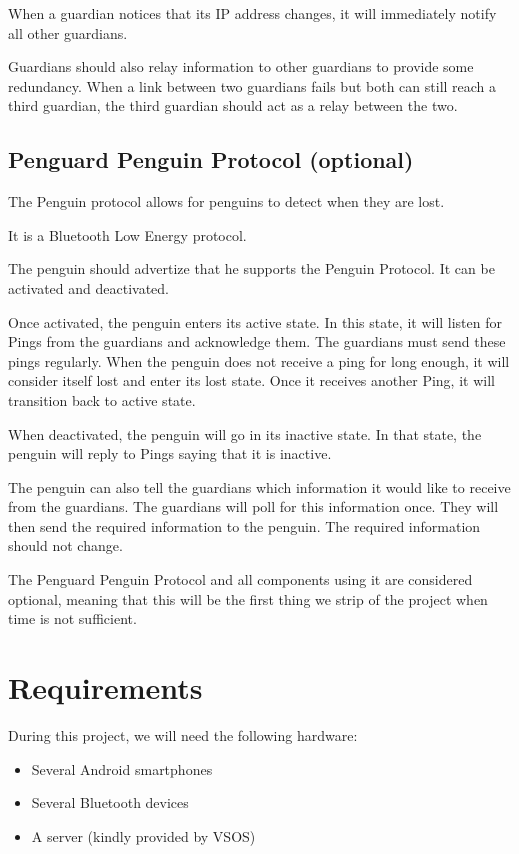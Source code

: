 \documentclass{report}
\begin{document}
When a guardian notices that its IP address changes, it will immediately notify all other guardians.

Guardians should also relay information to other guardians to provide some redundancy. When a link between two guardians fails but both can still reach a third guardian, the third guardian should act as a relay between the two.

\subsection{Penguard Penguin Protocol (optional)}

The Penguin protocol allows for penguins to detect when they are lost.

It is a Bluetooth Low Energy protocol.

The penguin should advertize that he supports the Penguin Protocol. It can be activated and deactivated.

Once activated, the penguin enters its active state. In this state, it will listen for Pings from the guardians and acknowledge them. The guardians must send these pings regularly. When the penguin does not receive a ping for long enough, it will consider itself lost and enter its lost state. Once it receives another Ping, it will transition back to active state.

When deactivated, the penguin will go in its inactive state. In that state, the penguin will reply to Pings saying that it is inactive.

The penguin can also tell the guardians which information it would like to receive from the guardians. The guardians will poll for this information once. They will then send the required information to the penguin. The required information should not change.

The Penguard Penguin Protocol and all components using it are considered optional, meaning that this will be the first thing we strip of the project when time is not sufficient.

\section{Requirements}

During this project, we will need the following hardware:

\begin{itemize}
    \item Several Android smartphones
    \item Several Bluetooth devices
    \item A server (kindly provided by VSOS)
\end{itemize}
\end{document}
